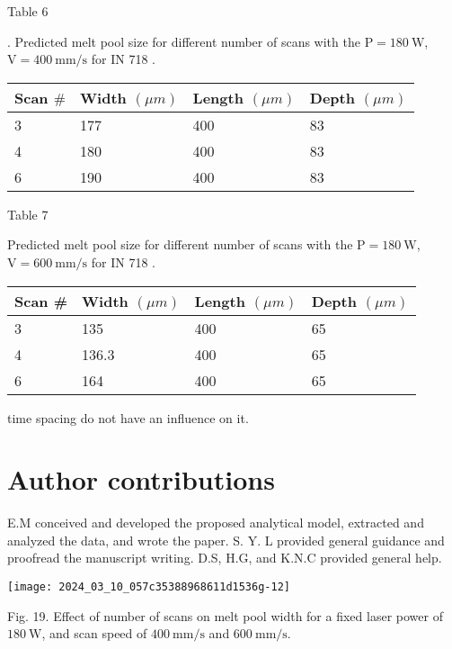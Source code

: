 \documentclass[10pt]{article}
\begin{document}
Table 6

. Predicted melt pool size for different number of scans with the $\mathrm{P}=180 \mathrm{~W}$, $\mathrm{V}=400 \mathrm{~mm} / \mathrm{s}$ for IN 718 .

\begin{center}
\begin{tabular}{llll}
\hline
Scan $\#$ & Width $(\mu m)$ & Length $(\mu m)$ & Depth $(\mu m)$ \\
\hline
3 & 177 & 400 & 83 \\
4 & 180 & 400 & 83 \\
6 & 190 & 400 & 83 \\
\hline
\end{tabular}
\end{center}

Table 7

Predicted melt pool size for different number of scans with the $\mathrm{P}=180 \mathrm{~W}$, $\mathrm{V}=600 \mathrm{~mm} / \mathrm{s}$ for IN 718 .

\begin{center}
\begin{tabular}{llll}
\hline
Scan \# & Width $(\mu m)$ & Length $(\mu m)$ & Depth $(\mu m)$ \\
\hline
3 & 135 & 400 & 65 \\
4 & 136.3 & 400 & 65 \\
6 & 164 & 400 & 65 \\
\hline
\end{tabular}
\end{center}

time spacing do not have an influence on it.

\section*{Author contributions}
E.M conceived and developed the proposed analytical model, extracted and analyzed the data, and wrote the paper. S. Y. L provided general guidance and proofread the manuscript writing. D.S, H.G, and K.N.C provided general help.

\begin{center}
\texttt{[image: 2024\_03\_10\_057c35388968611d1536g-12]}
\end{center}

Fig. 19. Effect of number of scans on melt pool width for a fixed laser power of $180 \mathrm{~W}$, and scan speed of $400 \mathrm{~mm} / \mathrm{s}$ and $600 \mathrm{~mm} / \mathrm{s}$.
\end{document}
